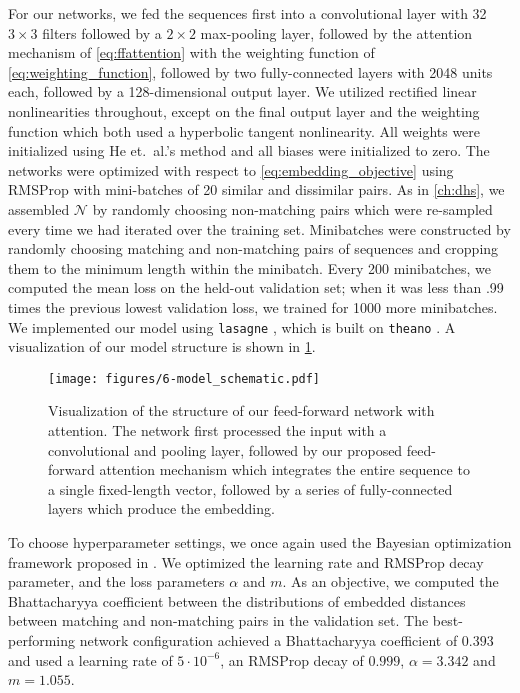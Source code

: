 For our networks, we fed the sequences first into a convolutional layer with 32 $3 \times 3$ filters followed by a $2 \times 2$ max-pooling layer, followed by the attention mechanism of \cref{eq:ffattention} with the weighting function of \cref{eq:weighting_function}, followed by two fully-connected layers with 2048 units each, followed by a 128-dimensional output layer.
We utilized rectified linear nonlinearities throughout, except on the final output layer and the weighting function which both used a hyperbolic tangent nonlinearity.
All weights were initialized using He et.\ al.'s method \cite{he2015delving} and all biases were initialized to zero.
The networks were optimized with respect to \cref{eq:embedding_objective} using RMSProp with mini-batches of 20 similar and dissimilar pairs.
As in \cref{ch:dhs}, we assembled $\mathcal{N}$ by randomly choosing non-matching pairs which were re-sampled every time we had iterated over the training set.
Minibatches were constructed by randomly choosing matching and non-matching pairs of sequences and cropping them to the minimum length within the minibatch.
Every 200 minibatches, we computed the mean loss on the held-out validation set; when it was less than .99 times the previous lowest validation loss, we trained for 1000 more minibatches.
We implemented our model using \texttt{lasagne} \cite{dieleman2015lasagne}, which is built on \texttt{theano} \cite{bergstra2010theano,bastien2012theano,al-rfou2016theano}.
A visualization of our model structure is shown in \cref{fig:model_schematic}.

\begin{figure}
  \texttt{[image: figures/6-model\_schematic.pdf]}
  \caption[Structure of our feed-forward attention network]{Visualization of the structure of our feed-forward network with attention.
The network first processed the input with a convolutional and pooling layer, followed by our proposed feed-forward attention mechanism which integrates the entire sequence to a single fixed-length vector, followed by a series of fully-connected layers which produce the embedding.}
  \label{fig:model_schematic}
\end{figure}

To choose hyperparameter settings, we once again used the Bayesian optimization framework proposed in \cite{snoek2012practical}.
We optimized the learning rate and RMSProp decay parameter, and the loss parameters $\alpha$ and $m$.
As an objective, we computed the Bhattacharyya coefficient \cite{bhattacharyya1943measure} between the distributions of embedded distances between matching and non-matching pairs in the validation set.
The best-performing network configuration achieved a Bhattacharyya coefficient of $0.393$ and used a learning rate of $5\cdot10^{-6}$, an RMSProp decay of $0.999$, $\alpha = 3.342$ and $m = 1.055$.

